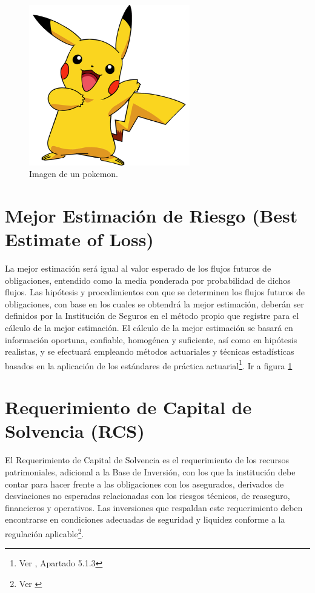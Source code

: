 \documentclass[11pt,twoside,openright,spanish]{report}
\numberwithin{equation}{chapter}
\numberwithin{figure}{chapter}
\numberwithin{table}{chapter}
\begin{document}
	\begin{figure}[h!]
	\centering
	\includegraphics[height=7cm]{Imagenes/pikachu.png}
	\caption{Imagen de un pokemon.}
	\label{pokemon}
	\end{figure}
 
	\section{Mejor Estimación de Riesgo (Best Estimate of Loss)}
	
	La mejor estimación será igual al valor esperado de los flujos futuros de obligaciones, entendido como la media ponderada por probabilidad de dichos flujos. Las hipótesis y procedimientos con que se determinen los flujos futuros de obligaciones, con base en los cuales se obtendrá la mejor estimación, deberán ser definidos por la Institución de Seguros en el método propio que registre para el cálculo de la mejor estimación. El cálculo de la mejor estimación se basará en información oportuna, confiable, homogénea y suficiente, así como en hipótesis realistas, y se efectuará empleando métodos actuariales y técnicas estadísticas basados en la aplicación de los estándares de práctica actuarial\footnote{Ver \citet{HCusf}, Apartado 5.1.3}. Ir a figura \ref{pokemon}
	
	\section{Requerimiento de Capital de Solvencia (RCS)}
	
	El Requerimiento de Capital de Solvencia es el requerimiento de los recursos patrimoniales, adicional a la Base de Inversión, con los que la institución debe contar para hacer frente a las obligaciones con los asegurados, derivados de desviaciones no esperadas relacionadas con los riesgos técnicos, de reaseguro, financieros y operativos. Las inversiones que respaldan este requerimiento deben encontrarse en condiciones adecuadas de seguridad y liquidez conforme a la regulación aplicable\footnote{Ver \citet{NRCS}}.
	
\end{document}
